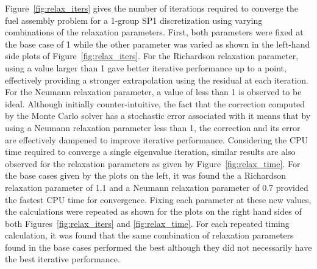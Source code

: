 Figure~\ref{fig:relax_iters} gives the number of iterations required
to converge the fuel assembly problem for a 1-group SP1 discretization
using varying combinations of the relaxation parameters. First, both
parameters were fixed at the base case of 1 while the other parameter
was varied as shown in the left-hand side plots of
Figure~\ref{fig:relax_iters}. For the Richardson relaxation parameter,
using a value larger than 1 gave better iterative performance up to a
point, effectively providing a stronger extrapolation using the
residual at each iteration. For the Neumann relaxation parameter, a
value of less than 1 is observed to be ideal. Although initially
counter-intuitive, the fact that the correction computed by the Monte
Carlo solver has a stochastic error associated with it means that by
using a Neumann relaxation parameter less than 1, the correction and
its error are effectively dampened to improve iterative
performance. Considering the CPU time required to converge a single
eigenvalue iteration, similar results are also observed for the
relaxation parameters as given by Figure~\ref{fig:relax_time}. For the
base cases given by the plots on the left, it was found the a
Richardson relaxation parameter of 1.1 and a Neumann relaxation
parameter of 0.7 provided the fastest CPU time for convergence. Fixing
each parameter at these new values, the calculations were repeated as
shown for the plots on the right hand sides of both
Figures~\ref{fig:relax_iters} and \ref{fig:relax_time}. For each
repeated timing calculation, it was found that the same combination of
relaxation parameters found in the base cases performed the best
although they did not necessarily have the best iterative performance.

